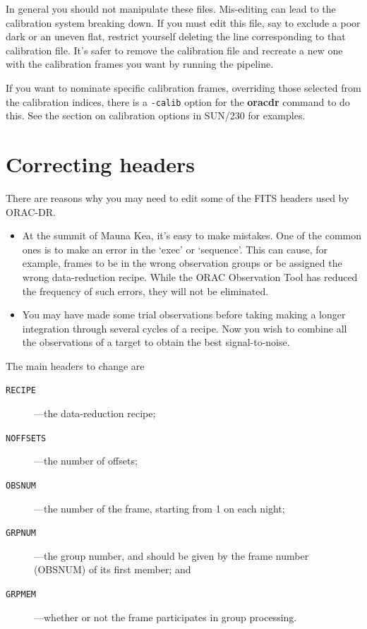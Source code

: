 \documentclass[twoside,11pt]{article}
\newenvironment{latexonly}{}{}
\newcommand{\xref}[3]{#1}
\newcommand{\xlabel}[1]{}
\renewcommand{\_}{\texttt{\symbol{95}}}
\newcommand{\ORACDR}{{\footnotesize ORAC-DR}}
\begin{document}
In general you should not manipulate these files.  Mis-editing can
lead to the calibration system breaking down.  If you must edit this
file, say to exclude a poor dark or an uneven flat, restrict yourself
deleting the line corresponding to that calibration file.  It's safer
to remove the calibration file and recreate a new one with the
calibration frames you want by running the pipeline.

If you want to nominate specific calibration frames, overriding those
selected from the calibration indices, there is a {\tt -calib} option
for the {\bf oracdr} command to do this.  See
\begin{latexonly}
the section on
\end{latexonly}
\xref{calibration options}{sun230}{calibration_options}
\begin{latexonly}
in SUN/230
\end{latexonly}
for examples.

\section{\xlabel{correcting_headers}Correcting headers\label{correcting_headers}}

There are reasons why you may need to edit some of the FITS headers
used by \ORACDR.

\begin{itemize}
\item  At the summit of Mauna Kea, it's easy to make mistakes.  One of
the common ones is to make an error in the `exec' or `sequence'.  This
can cause, for example, frames to be in the wrong observation groups
or be assigned the wrong data-reduction recipe.  While the ORAC
Observation Tool has reduced the frequency of such errors, they will
not be eliminated.

\item You may have made some trial observations before taking making
a longer integration through several cycles of a recipe.  Now you wish
to combine all the observations of a target to obtain the best
signal-to-noise.  
\end{itemize}

The main headers to change are
\begin{description}
\item [{\tt RECIPE}]---the data-reduction recipe;
\item [{\tt NOFFSETS}]---the number of offsets;
\item [{\tt OBSNUM}]---the number of the frame, starting from 1 on
each night;
\item [{\tt GRPNUM}]---the group number, and should be
given by the frame number (OBSNUM) of its first member; and
\item [{\tt GRPMEM}]---whether or not the frame participates in group
processing.
\end{description}
\end{document}
